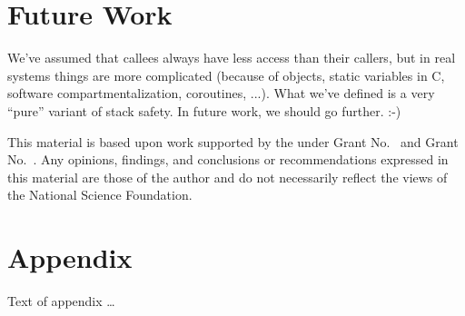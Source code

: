 \documentclass[acmsmall,review,anonymous]{acmart}\settopmatter{printfolios=true,printccs=false,printacmref=false}
\begin{document}
\section{Future Work}

We've assumed that callees always have less access than their callers, but
in real systems things are more complicated (because of objects, static
variables in C, software compartmentalization, coroutines, ...).  What we've
defined is a very ``pure'' variant of stack safety.  In future work, we
should go further. :-)


\begin{acks}                            %
  This material is based upon work supported by the
   under Grant
  No.~ and Grant
  No.~.  Any opinions, findings, and
  conclusions or recommendations expressed in this material are those
  of the author and do not necessarily reflect the views of the
  National Science Foundation.
\end{acks}


%


\appendix
\section{Appendix}

Text of appendix \ldots
\end{document}
